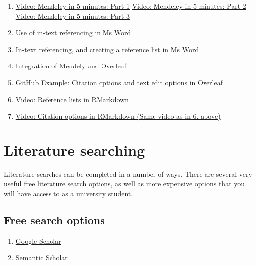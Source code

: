 \documentclass[
]{book}
\providecommand{\tightlist}{%
  \setlength{\itemsep}{0pt}\setlength{\parskip}{0pt}}
\begin{document}
\begin{enumerate}
\def\labelenumi{\arabic{enumi}.}
\item
  \href{https://youtu.be/MiKbS01Aulo}{Video: Mendeley in 5 minutes: Part 1}
  \href{https://youtu.be/kSu4tO8Dwak}{Video: Mendeley in 5 minutes: Part 2}
  \href{https://youtu.be/XU3cjfY4G5s}{Video: Mendeley in 5 minutes: Part 3}
\item
  \href{https://youtu.be/XTfVCiksapk}{Use of in-text referencing in Ms Word}
\item
  \href{https://youtu.be/zkrVbBSrK_w}{In-text referencing, and creating a reference list in Ms Word}
\item
  \href{https://www.loom.com/share/6d0d4f7108f041d082253c636a52dee8}{Integration of Mendely and Overleaf}
\item
  \href{https://github.com/robabsmith/Example-project}{GitHub Example: Citation options and text edit options in Overleaf}
\item
  \href{https://www.loom.com/share/407ae8d0f00e4a05941a9a09e5e13f96}{Video: Reference lists in RMarkdown}
\item
  \href{https://www.loom.com/share/407ae8d0f00e4a05941a9a09e5e13f96}{Video: Citation options in RMarkdown (Same video as in 6. above)}
\end{enumerate}

\hypertarget{literature-searching}{%
\chapter{Literature searching}\label{literature-searching}}

Literature searches can be completed in a number of ways. There are several very useful free literature search options, as well as more expensive options that you will have access to as a university student.

\hypertarget{free-search-options}{%
\section{Free search options}\label{free-search-options}}

\begin{enumerate}
\def\labelenumi{\arabic{enumi}.}
\tightlist
\item
  \href{https://scholar.google.com}{Google Scholar}
\item
  \href{https://www.semanticscholar.org}{Semantic Scholar}
\end{enumerate}
\end{document}
